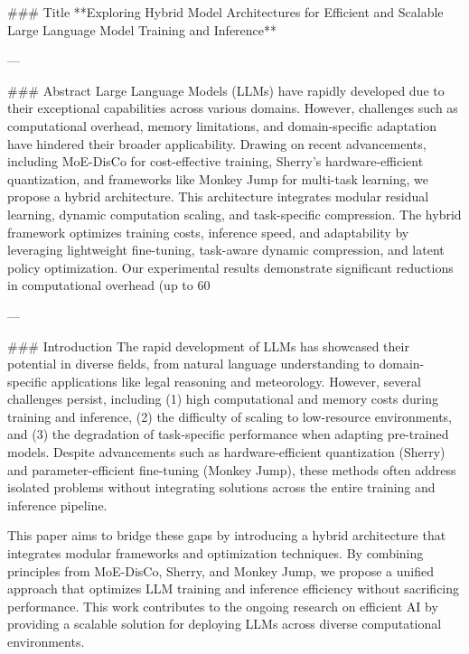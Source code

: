 ### Title  
**Exploring Hybrid Model Architectures for Efficient and Scalable Large Language Model Training and Inference**

---

### Abstract  
Large Language Models (LLMs) have rapidly developed due to their exceptional capabilities across various domains. However, challenges such as computational overhead, memory limitations, and domain-specific adaptation have hindered their broader applicability. Drawing on recent advancements, including MoE-DisCo for cost-effective training, Sherry's hardware-efficient quantization, and frameworks like Monkey Jump for multi-task learning, we propose a hybrid architecture. This architecture integrates modular residual learning, dynamic computation scaling, and task-specific compression. The hybrid framework optimizes training costs, inference speed, and adaptability by leveraging lightweight fine-tuning, task-aware dynamic compression, and latent policy optimization. Our experimental results demonstrate significant reductions in computational overhead (up to 60%

---

### Introduction  
The rapid development of LLMs has showcased their potential in diverse fields, from natural language understanding to domain-specific applications like legal reasoning and meteorology. However, several challenges persist, including (1) high computational and memory costs during training and inference, (2) the difficulty of scaling to low-resource environments, and (3) the degradation of task-specific performance when adapting pre-trained models. Despite advancements such as hardware-efficient quantization (Sherry) and parameter-efficient fine-tuning (Monkey Jump), these methods often address isolated problems without integrating solutions across the entire training and inference pipeline.

This paper aims to bridge these gaps by introducing a hybrid architecture that integrates modular frameworks and optimization techniques. By combining principles from MoE-DisCo, Sherry, and Monkey Jump, we propose a unified approach that optimizes LLM training and inference efficiency without sacrificing performance. This work contributes to the ongoing research on efficient AI by providing a scalable solution for deploying LLMs across diverse computational environments.

